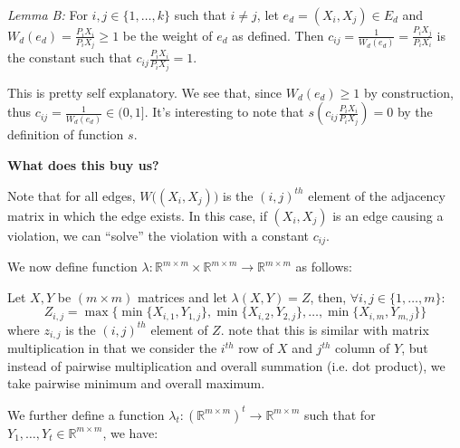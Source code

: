 \documentclass{article} %
\begin{document}
\bigskip

\textit{Lemma B:} For $i,j\in\{1,\ldots,k\}$ such that $i\not=j$, let $e_d=(X_i,X_j)\in E_d$ and $W_d(e_d)=\frac{P_iX_i}{P_iX_j}\geq1$ be the weight of $e_d$ as defined. Then $c_{ij}=\frac{1}{W_d(e_d)}=\frac{P_iX_j}{P_iX_i}$ is the constant such that $c_{ij}\frac{P_iX_i}{P_iX_j}=1$.

This is pretty self explanatory. We see that, since $W_d(e_d)\geq1$ by construction, thus $c_{ij}=\frac{1}{W_d(e_d)}\in(0,1]$. It's interesting to note that $s(c_{ij}\frac{P_iX_i}{P_iX_j})=0$ by the definition of function $s$.

\textbf{What does this buy us?}

Note that for all edges, $W\big((X_i, X_j)\big)$ is the $(i,j)^{th}$ element of the adjacency matrix in which the edge exists. In this case, if $(X_i, X_j)$ is an edge causing a violation, we can ``solve'' the violation with a constant $c_{ij}$.
\bigskip

We now define function $\lambda:\mathbb{R}^{m\times m} \times \mathbb{R}^{m\times m} \to \mathbb{R}^{m\times m}$ as follows:

Let $X,Y$ be $(m\times m)$ matrices and let $\lambda(X,Y)=Z$, then, $\forall i,j\in\{1,\ldots,m\}$:
$$Z_{i,j}=\max\{\min\{X_{i,1}, Y_{1,j}\}, \min\{X_{i,2}, Y_{2,j}\}, \ldots, \min\{X_{i,m}, Y_{m,j}\}\}$$
where $z_{i,j}$ is the $(i,j)^{th}$ element of $Z$. note that this is similar with matrix multiplication in that we consider the $i^{th}$ row of $X$ and $j^{th}$ column of $Y$, but instead of pairwise multiplication and overall summation (i.e. dot product), we take pairwise minimum and overall maximum. 
\bigskip

We further define a function $\lambda_t:(\mathbb{R}^{m\times m})^t\to\mathbb{R}^{m\times m}$ such that for $Y_1,\ldots,Y_t\in \mathbb{R}^{m\times m}$, we have:
\end{document}
